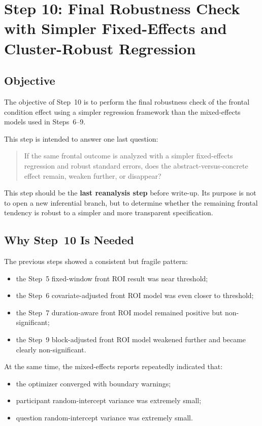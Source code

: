 \section{Step 10: Final Robustness Check with Simpler Fixed-Effects and Cluster-Robust Regression}
\label{sec:step10_final_robustness}

\subsection{Objective}
The objective of Step~10 is to perform the final robustness check of the frontal condition effect
using a simpler regression framework than the mixed-effects models used in Steps~6--9.

This step is intended to answer one last question:
\begin{quote}
If the same frontal outcome is analyzed with a simpler fixed-effects regression and robust standard errors,
does the abstract-versus-concrete effect remain, weaken further, or disappear?
\end{quote}

This step should be the \textbf{last reanalysis step} before write-up.
Its purpose is not to open a new inferential branch, but to determine whether the remaining frontal
tendency is robust to a simpler and more transparent specification.

\subsection{Why Step~10 Is Needed}
The previous steps showed a consistent but fragile pattern:
\begin{itemize}
    \item the Step~5 fixed-window front ROI result was near threshold;
    \item the Step~6 covariate-adjusted front ROI model was even closer to threshold;
    \item the Step~7 duration-aware front ROI model remained positive but non-significant;
    \item the Step~9 block-adjusted front ROI model weakened further and became clearly non-significant.
\end{itemize}

At the same time, the mixed-effects reports repeatedly indicated that:
\begin{itemize}
    \item the optimizer converged with boundary warnings;
    \item participant random-intercept variance was extremely small;
    \item question random-intercept variance was extremely small.
\end{itemize}

